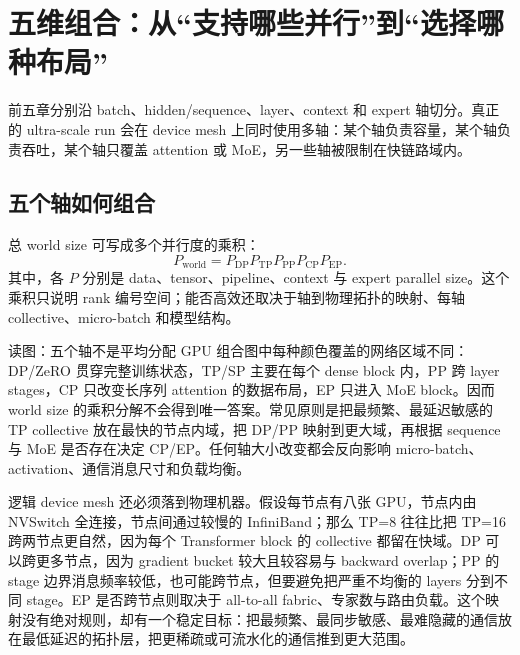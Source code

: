 \section{五维组合：从“支持哪些并行”到“选择哪种布局”}

前五章分别沿 batch、hidden/sequence、layer、context 和 expert 轴切分。真正的 ultra-scale run 会在 device mesh 上同时使用多轴：某个轴负责容量，某个轴负责吞吐，某个轴只覆盖 attention 或 MoE，另一些轴被限制在快链路域内。

\subsection{五个轴如何组合}

总 world size 可写成多个并行度的乘积：
\[
P_{\mathrm{world}}
=P_{\mathrm{DP}}P_{\mathrm{TP}}P_{\mathrm{PP}}P_{\mathrm{CP}}P_{\mathrm{EP}}.
\]
其中，各 $P$ 分别是 data、tensor、pipeline、context 与 expert parallel size。这个乘积只说明 rank 编号空间；能否高效还取决于轴到物理拓扑的映射、每轴 collective、micro-batch 和模型结构。



\begin{knowledgebox}{读图：五个轴不是平均分配 GPU}
组合图中每种颜色覆盖的网络区域不同：DP/ZeRO 贯穿完整训练状态，TP/SP 主要在每个 dense block 内，PP 跨 layer stages，CP 只改变长序列 attention 的数据布局，EP 只进入 MoE block。因而 world size 的乘积分解不会得到唯一答案。常见原则是把最频繁、最延迟敏感的 TP collective 放在最快的节点内域，把 DP/PP 映射到更大域，再根据 sequence 与 MoE 是否存在决定 CP/EP。任何轴大小改变都会反向影响 micro-batch、activation、通信消息尺寸和负载均衡。
\end{knowledgebox}

逻辑 device mesh 还必须落到物理机器。假设每节点有八张 GPU，节点内由 NVSwitch 全连接，节点间通过较慢的 InfiniBand；那么 TP=8 往往比把 TP=16 跨两节点更自然，因为每个 Transformer block 的 collective 都留在快域。DP 可以跨更多节点，因为 gradient bucket 较大且较容易与 backward overlap；PP 的 stage 边界消息频率较低，也可能跨节点，但要避免把严重不均衡的 layers 分到不同 stage。EP 是否跨节点则取决于 all-to-all fabric、专家数与路由负载。这个映射没有绝对规则，却有一个稳定目标：把最频繁、最同步敏感、最难隐藏的通信放在最低延迟的拓扑层，把更稀疏或可流水化的通信推到更大范围。

